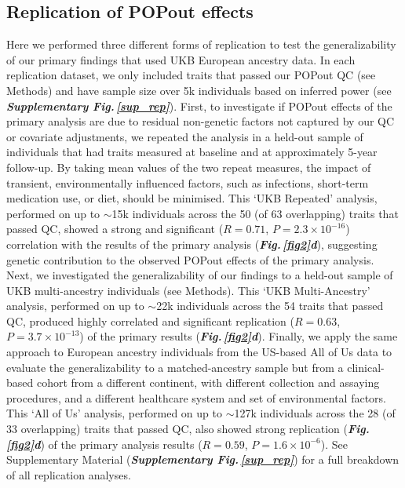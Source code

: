 \documentclass[12pt]{zHenriquesLab-StyleBioRxiv}
\newcommand\dref[2]{\normalsize{\textbf{\textit{Fig.\,\ref{#1}#2}}}\normalsize{}}
\newcommand\sref[1]{\normalsize{\textbf{\textit{Supplementary Fig.\,\ref{#1}}}}\normalsize{}}
\begin{document}
{{\subsection*{Replication of POPout effects} \label{sec:res1}
Here we performed three different forms of replication to test the generalizability of our primary 
findings that used UKB European ancestry data. In each replication dataset, 
we only included traits that passed our POPout QC (see Methods) and have sample size 
over 5k individuals based on inferred power (see \sref{sup_rep}). First, 
to investigate if POPout effects of the primary analysis are due to residual 
non-genetic factors not captured by our QC or covariate adjustments, we repeated 
the analysis in a held-out sample of individuals that had traits measured at 
baseline and at approximately 5-year follow-up. By taking mean values of the 
two repeat measures, the impact of transient, environmentally influenced factors, 
such as infections, short-term medication use, or diet, should be minimised. 
This ‘UKB Repeated’ analysis, performed on up to $\sim$15k individuals across the 
50 (of 63 overlapping) traits that passed QC, showed a strong and 
significant ($R=0.71$, $P=2.3 \times 10^{-16}$) correlation with the results 
of the primary analysis (\dref{fig2}{d}), suggesting genetic contribution to the 
observed POPout effects of the primary analysis. Next, we investigated the generalizability 
of our findings to a held-out sample of UKB multi-ancestry individuals (see Methods). 
This ‘UKB Multi-Ancestry’ analysis, performed on up to $\sim$22k individuals across the 
54 traits that passed QC, produced highly correlated and significant 
replication ($R=0.63$, $P=3.7 \times 10^{-13}$) of the primary results (\dref{fig2}{d}). 
Finally, we apply the same approach to European ancestry individuals from the 
US-based All of Us data \cite{Bick2024} to evaluate the generalizability to a matched-ancestry 
sample but from a clinical-based cohort from a different continent, with different 
collection and assaying procedures, and a different healthcare system and set of 
environmental factors. This ‘All of Us’ analysis, performed on up to $\sim$127k individuals 
across the 28 (of 33 overlapping) traits that passed QC, also showed strong replication (\dref{fig2}{d}) of the primary 
analysis results ($R=0.59$, $P=1.6 \times 10^{-6}$). 
See Supplementary Material (\sref{sup_rep}) for a full breakdown of all replication analyses. 
%
%
}}
\end{document}
